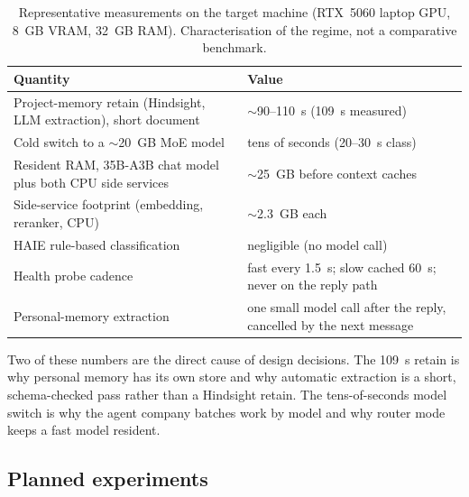 \begin{table}[t]
\caption{Representative measurements on the target machine (RTX~5060 laptop GPU, 8~GB VRAM, 32~GB RAM). Characterisation of the regime, not a comparative benchmark.}
\label{tab:early}
\centering\footnotesize
\begin{tabularx}{\columnwidth}{@{}YL{30mm}@{}}
\toprule
Quantity & Value \\
\midrule
Project-memory retain (Hindsight, LLM extraction), short document & $\sim$90--110~s (109~s measured) \\
Cold switch to a $\sim$20~GB MoE model & tens of seconds (20--30~s class) \\
Resident RAM, 35B-A3B chat model plus both CPU side services & $\sim$25~GB before context caches \\
Side-service footprint (embedding, reranker, CPU) & $\sim$2.3~GB each \\
HAIE rule-based classification & negligible (no model call) \\
Health probe cadence & fast every 1.5~s; slow cached 60~s; never on the reply path \\
Personal-memory extraction & one small model call after the reply, cancelled by the next message \\
\bottomrule
\end{tabularx}
\end{table}

Two of these numbers are the direct cause of design decisions. The 109~s retain is why personal memory has its own store and why automatic extraction is a short, schema-checked pass rather than a Hindsight retain. The tens-of-seconds model switch is why the agent company batches work by model and why router mode keeps a fast model resident.

\subsection{Planned experiments}

